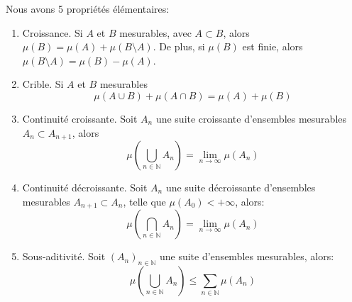 \begin{prop}\label{prop:mesure:elementaire}
	Nous avons 5 propriétés élémentaires:
	\begin{enumerate}
		\item Croissance. Si $A$ et $B$ mesurables, avec $A \subset B$, alors $\mu(B) = \mu(A) + \mu(B \setminus A)$. De plus,
		      si $\mu(B)$ est finie, alors $\mu(B\setminus A) = \mu(B) - \mu(A)$.
		\item Crible. Si $A$ et $B$ mesurables
		      \[\mu(A\cup B) + \mu(A \cap B) = \mu(A) + \mu(B)\]
		\item Continuité croissante. Soit $A_n$ une suite croissante d'ensembles mesurables $A_n \subset A_{n+1}$,
		      alors
		      \[\mu(\bigcup\limits_{n \in \mathbb{N}} A_n) = \lim\limits_{n \to \infty} \mu(A_n)\]
		\item Continuité décroissante. Soit $A_n$ une suite décroissante d'ensembles mesurables $A_{n+1}
			      \subset A_n$, telle que $\mu(A_0) < +\infty$, alors:
		      \[\mu(\bigcap\limits_{n \in \mathbb{N}} A_n) = \lim\limits_{n \to \infty} \mu(A_n)\]
		\item Sous-aditivité. Soit $(A_n)_{n \in \mathbb{N}}$ une suite d'ensembles mesurables, alors:
		      \[\mu(\bigcup\limits_{n \in \mathbb{N}} A_n) \leq \sum\limits_{n \in \mathbb{N}} \mu(A_n)\]
	\end{enumerate}
\end{prop}

